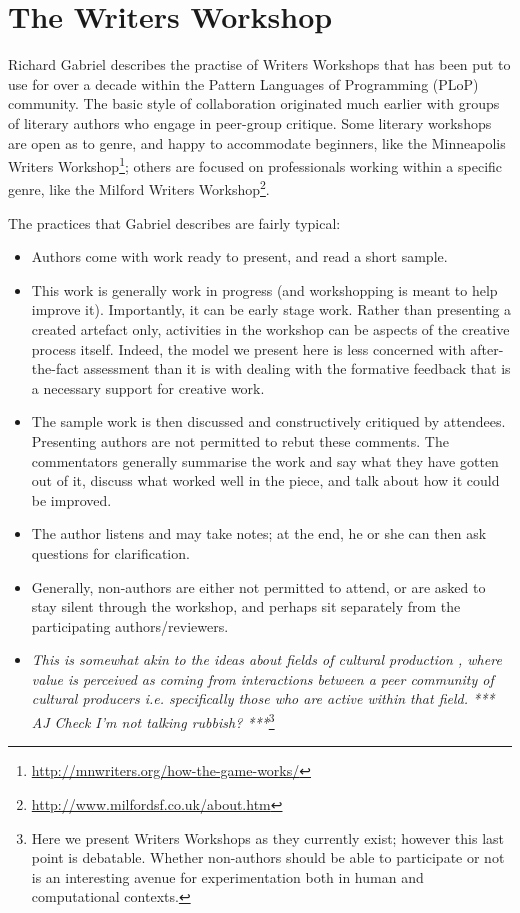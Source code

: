 \section{The Writers Workshop} \label{sec:writers-workshop}

Richard Gabriel \citeyear{gabriel2002writer} describes the practise of
Writers Workshops that has been put to use for over a decade within
the Pattern Languages of Programming (PLoP) community.  The basic
style of collaboration originated much earlier with groups of literary
authors who engage in peer-group critique.  Some literary workshops
are open as to genre, and happy to accommodate beginners, like the
Minneapolis Writers
Workshop\footnote{\url{http://mnwriters.org/how-the-game-works/}};
others are focused on professionals working within a specific genre,
like the Milford Writers
Workshop\footnote{\url{http://www.milfordsf.co.uk/about.htm}}.  

The
practices that Gabriel describes are fairly typical:  
\begin{itemize}
\item Authors come with work ready to present, and read a short
  sample.
\item This work is generally work in progress (and workshopping is
  meant to help improve it).  Importantly, it can be early stage work.
  Rather than presenting a created artefact only, activities in the
  workshop can be aspects of the creative process itself.  Indeed, the
  model we present here is less concerned with after-the-fact
  assessment than it is with dealing with the formative feedback that
  is a necessary support for creative work.
\item The sample work is then
discussed and constructively critiqued by attendees.  Presenting
authors are not permitted to rebut these comments.  The commentators
generally summarise the work and say what they have gotten out of it,
discuss what worked well in the piece, and talk about how it could be
improved.  
\item The author listens and may take notes; at the end, he or
she can then ask questions for clarification.  
\item Generally, non-authors
are either not permitted to attend, or are asked to stay silent
through the workshop, and perhaps sit separately from the
participating authors/reviewers.
\item {\em This is somewhat akin to the ideas about fields of cultural production \cite{bourdieu93}, where value is perceived as coming from interactions between a peer community of cultural producers i.e. specifically those who are active within that field. *** AJ Check I'm not talking rubbish? ***}\footnote{Here we present Writers Workshops as they currently exist; however this last point is debatable. Whether non-authors should be able to participate or not is an interesting avenue for experimentation both in human and computational contexts.}
\end{itemize}

